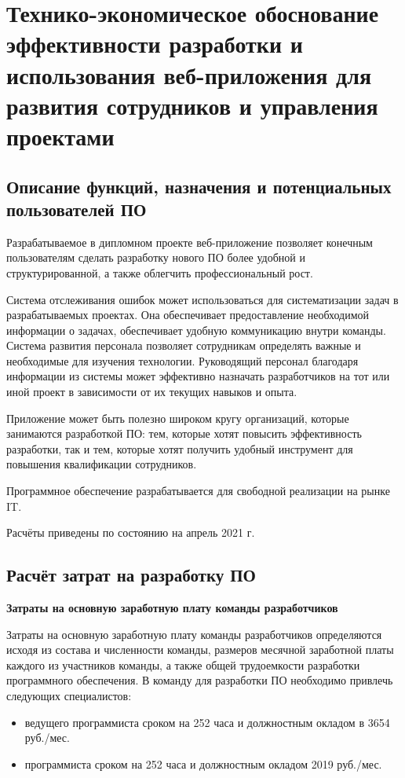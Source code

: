 \section{Технико-экономическое обоснование эффективности разработки и использования веб-приложения для развития сотрудников и управления проектами}\label{sec:economics}

\subsection{Описание функций, назначения и потенциальных пользователей ПО}

Разрабатываемое в дипломном проекте веб-приложение позволяет конечным пользователям сделать разработку нового ПО более удобной и структурированной, а также облегчить профессиональный рост. 

Система отслеживания ошибок может использоваться для систематизации задач в разрабатываемых проектах. Она обеспечивает предоставление необходимой информации о задачах, обеспечивает удобную коммуникацию внутри команды. Система развития персонала позволяет сотрудникам определять важные и необходимые для изучения технологии. Руководящий персонал благодаря информации из системы может эффективно назначать разработчиков на тот или иной проект в зависимости от их текущих навыков и опыта.

Приложение может быть полезно широком кругу организаций, которые занимаются разработкой ПО: тем, которые хотят повысить эффективность разработки, так и тем, которые хотят получить удобный инструмент для повышения квалификации сотрудников.

Программное обеспечение разрабатывается для свободной реализации на рынке IT.

Расчёты приведены по состоянию на апрель 2021 г.

\subsection{Расчёт затрат на разработку ПО}

\textbf{Затраты на основную заработную плату команды разработчиков}

Затраты на основную заработную плату команды разработчиков определяются исходя из состава и численности команды, размеров месячной заработной платы каждого из участников команды, а также общей трудоемкости разработки программного обеспечения. В команду для разработки ПО необходимо привлечь следующих специалистов:
\begin{itemize}
    \item ведущего программиста сроком на 252 часа и должностным окладом в 3654 руб./мес.
    \item программиста сроком на 252 часа и должностным окладом 2019 руб./мес.
\end{itemize}

